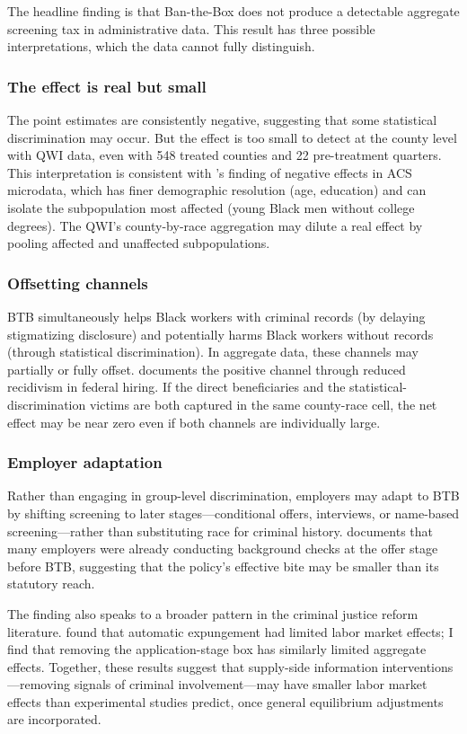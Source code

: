 \documentclass[12pt]{article}
\begin{document}
The headline finding is that Ban-the-Box does not produce a detectable aggregate screening tax in administrative data. This result has three possible interpretations, which the data cannot fully distinguish.

\subsubsection*{The effect is real but small} The point estimates are consistently negative, suggesting that some statistical discrimination may occur. But the effect is too small to detect at the county level with QWI data, even with 548 treated counties and 22 pre-treatment quarters. This interpretation is consistent with \citet{doleac2020}'s finding of negative effects in ACS microdata, which has finer demographic resolution (age, education) and can isolate the subpopulation most affected (young Black men without college degrees). The QWI's county-by-race aggregation may dilute a real effect by pooling affected and unaffected subpopulations.

\subsubsection*{Offsetting channels} BTB simultaneously helps Black workers with criminal records (by delaying stigmatizing disclosure) and potentially harms Black workers without records (through statistical discrimination). In aggregate data, these channels may partially or fully offset. \citet{craigie2020} documents the positive channel through reduced recidivism in federal hiring. If the direct beneficiaries and the statistical-discrimination victims are both captured in the same county-race cell, the net effect may be near zero even if both channels are individually large.

\subsubsection*{Employer adaptation} Rather than engaging in group-level discrimination, employers may adapt to BTB by shifting screening to later stages---conditional offers, interviews, or name-based screening---rather than substituting race for criminal history. \citet{bartik2018} documents that many employers were already conducting background checks at the offer stage before BTB, suggesting that the policy's effective bite may be smaller than its statutory reach.

The finding also speaks to a broader pattern in the criminal justice reform literature. \citet{jackson2023} found that automatic expungement had limited labor market effects; I find that removing the application-stage box has similarly limited aggregate effects. Together, these results suggest that supply-side information interventions---removing signals of criminal involvement---may have smaller labor market effects than experimental studies predict, once general equilibrium adjustments are incorporated.
\end{document}
